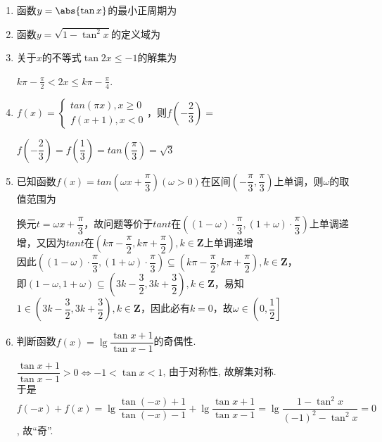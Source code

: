 \begin{enumerate}
    \item 函数$y=\abs{\tan{x}}$的最小正周期为\blkda{$\pi$}
    \item 函数$y=\sqrt{1-\tan^2x}$的定义域为
    \item 关于$x$的不等式$\tan2x\leq-1$的解集为\blkda[4]{$(\frac{k\pi}{2}-\frac{\pi}{4},\frac{k\pi}{2}-\frac{\pi}{8}](k\zz)$}
    \begin{jieda}
    $k\pi-\frac{\pi}{2}<2x\leq k\pi-\frac{\pi}{4}$. 
    \end{jieda}
    \item $f(x) = \left \{ \begin{array}{l}
         tan(\pi x), x \geq 0 \\
         f(x+1), x < 0
    \end{array} \right.$，则$f\left(-\dfrac{2}{3}\right) = $
    \begin{jieda}
        $f\left(-\dfrac{2}{3}\right) = f\left(\dfrac{1}{3}\right) = tan\left(\dfrac{\pi}{3}\right) = \sqrt{3}$
    \end{jieda}
    \item 已知函数$f(x) = tan\left(\omega x + \dfrac{\pi}{3}\right) (\omega > 0)$在区间$\left(-\dfrac{\pi}{3}, \dfrac{\pi}{3}\right)$上单调，则$\omega$的取值范围为\blkda{$\left(0, \dfrac{1}{2}\right]$}
    \begin{jieda}
        换元$t = \omega x + \dfrac{\pi}{3}$，故问题等价于$tant$在$\left((1-\omega) \cdot \dfrac{\pi}{3}, (1+\omega) \cdot \dfrac{\pi}{3}\right)$上单调递增，又因为$tant$在$\left(k\pi - \dfrac{\pi}{2}, k\pi+\dfrac{\pi}{2} \right), k \in \mathbf{Z}$上单调递增 \\
        因此$\left((1-\omega) \cdot \dfrac{\pi}{3}, (1+\omega) \cdot \dfrac{\pi}{3}\right) \subseteq \left(k\pi - \dfrac{\pi}{2}, k\pi+\dfrac{\pi}{2} \right), k \in \mathbf{Z}$，\\
        即$\left(1-\omega, 1+\omega\right) \subseteq \left(3k-\dfrac{3}{2}, 3k+\dfrac{3}{2}\right), k \in \mathbf{Z}$，易知$1 \in \left(3k-\dfrac{3}{2}, 3k+\dfrac{3}{2}\right), k \in \mathbf{Z}$，因此必有$k = 0$，故$\omega \in \left(0, \dfrac{1}{2}\right]$
    \end{jieda}
    \item 判断函数$f(x)=\lg\dfrac{\tan{x}+1}{\tan{x}-1}$的奇偶性. 
    \begin{jieda}
    $\dfrac{\tan{x}+1}{\tan{x}-1}>0\iff -1<\tan{x}<1$, 由于对称性, 故解集对称. \\
    于是$f(-x)+f(x)=\lg\dfrac{\tan(-x)+1}{\tan(-x)-1}+\lg\dfrac{\tan{x}+1}{\tan{x}-1}=\lg\dfrac{1-\tan^2x}{(-1)^2-\tan^2x}=0$, 故``奇''. 
    \end{jieda}


\end{enumerate}
